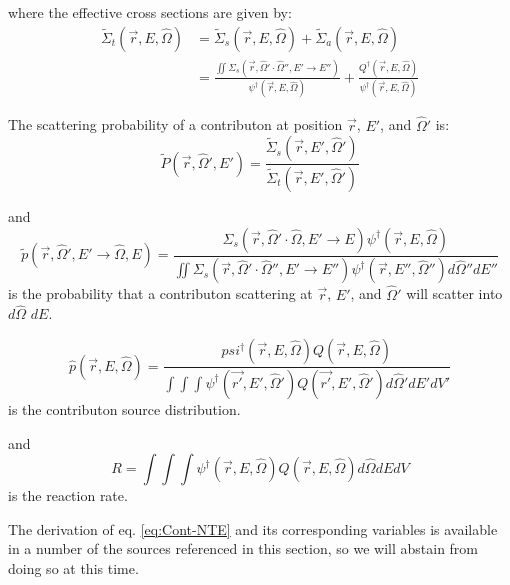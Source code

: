 where the effective cross sections are given by:
\begin{equation}
\begin{aligned}
\widetilde{\Sigma}_{t}(\vec{r}, E, \hat\Omega) &= \widetilde{\Sigma}_{s}(\vec{r}, E, \hat\Omega) + \widetilde{\Sigma}_{a}(\vec{r}, E, \hat\Omega)
\\
&= \frac{\iint \Sigma_{s}(\vec{r},\hat\Omega'\cdot\hat\Omega'',E'\rightarrow E'')}
{\psi^{\dagger}(\vec{r}, E, \hat\Omega)}
+ \frac{Q^{\dagger}(\vec{r}, E, \hat\Omega)}{\psi^{\dagger}(\vec{r}, E, \hat\Omega)}
\end{aligned}
\end{equation}

The scattering probability of a contributon at position $\vec{r}$, $E'$, and $\hat\Omega'$ is:
\begin{equation}
\widetilde{P}(\vec{r}, \hat\Omega',E') = \frac{\widetilde{\Sigma} _{ s }(\vec{r}, E', \hat\Omega')}{\widetilde{\Sigma} _{ t }(\vec{r}, E', \hat\Omega')}
\end{equation}

and
\begin{equation}
\widetilde{p}(\vec{r}, \hat\Omega', E'\rightarrow\hat\Omega, E) =
\frac{\Sigma_{s}(\vec{r},\hat\Omega'\cdot\hat\Omega,E'\rightarrow E) \psi^{\dagger} (\vec{r}, E, \hat\Omega)}
{\iint \Sigma_{s}(\vec{r},\hat\Omega'\cdot\hat\Omega'',E'\rightarrow E'')\psi^{\dagger} (\vec{r}, E'', \hat\Omega'')d\hat\Omega'' dE''}
\end{equation}
is the probability that a contributon scattering at $\vec{r}$, $E'$, and $\hat\Omega'$ will scatter into $d\hat\Omega$ $dE$.

\begin{equation}
\hat p(\vec{r}, E, \hat\Omega) =
\frac{psi^{\dagger}(\vec{r}, E, \hat\Omega) Q(\vec{r},E,\hat\Omega)}
{\int \int \int \psi^{\dagger}(\vec{r'},E',\hat\Omega')Q(\vec{r'},E',\hat\Omega') d\hat\Omega' dE' dV'}
\end{equation}
is the contributon source distribution.

and
\begin{equation}
R = \int \int \int \psi^{\dagger}(\vec{r},E,\hat\Omega)Q(\vec{r},E,\hat\Omega) d\hat\Omega dE dV
\end{equation}
is the reaction rate.


The derivation of eq. \ref{eq:Cont-NTE} and its corresponding variables is available in a number of the sources referenced in this section, so we will abstain from doing so at this time.

